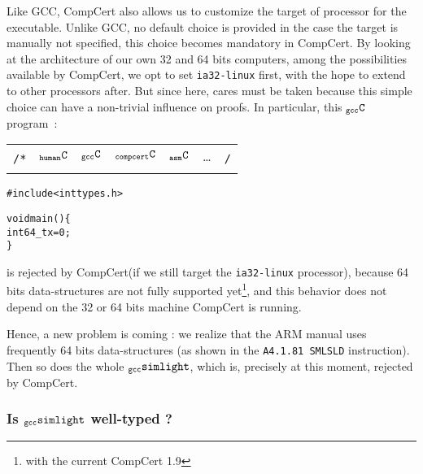 \documentclass[a4paper, 11pt]{article}
\newenvironment{humC}
  {%
   \begin{alltt}
   \footnotesize}
  {\end{alltt} %
  }
\newcommand{\compcert}{CompCert 1.9\xspace}
\newcommand{\ccert}{CompCert\xspace}
\newcommand{\yes}{\ding{51}}
\newcommand{\no}{\ding{55}}
\newcommand{\gccSL}{$_{\tt gcc}{\tt simlight}$\xspace}
\newcommand{\C}{$_{\tt compcert}{\tt C}$\xspace}
\newcommand{\gccC}{$_{\tt gcc}{\tt C}$\xspace}
\newcommand{\hC}{$_{\tt human}{\tt C}$\xspace}
\newcommand{\aC}{$_{\tt asm}{\tt C}$\xspace}
\begin{document}
Like GCC, \ccert also allows us to customize the target of processor for the executable. Unlike GCC, no default choice is provided in the case the target is manually not specified, this choice becomes mandatory in \ccert. By looking at the architecture of our own 32 and 64 bits computers, among the possibilities available by \ccert, we opt to set \verb|ia32-linux| first, with the hope to extend to other processors after. But since here, cares must be taken because this simple choice can have a non-trivial influence on proofs. In particular, this \gccC program~:
{\newline\tiny
\begin{tabular}{rc|c|c|c|cl}
\multirow{2}{*}{{\footnotesize{\tt /*}}} & \hC  & \gccC  & \C & \aC & \ldots & \multirow{2}{*}{{\footnotesize{\tt */}}} \\
 & \yes & \yes & \no & \no & \\
\end{tabular}}
\begin{humC}
#include <inttypes.h>

void main() \{
  int64_t x = 0;
\}
\end{humC}
is rejected by \ccert (if we still target the \verb|ia32-linux| processor), because 64 bits data-structures are not fully supported yet\footnote{with the current \compcert}, and this behavior does not depend on the 32 or 64 bits machine \ccert is running.

Hence, a new problem is coming : we realize that the ARM manual uses frequently 64 bits data-structures (as shown in the {\tt A4.1.81 SMLSLD} instruction). Then so does the whole \gccSL, which is, precisely at this moment, rejected by \ccert.

\subsubsection{Is \gccSL well-typed ?}
\end{document}
